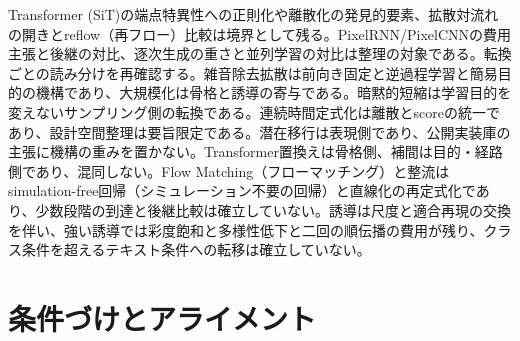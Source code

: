 \documentclass[lualatex,a4paper,10pt]{jlreq}
\begin{document}
Transformer (SiT)の端点特異性への正則化や離散化の発見的要素、拡散対流れの開きとreflow（再フロー）比較は境界として残る\autocite{btd026}。PixelRNN/PixelCNNの費用主張と後継の対比、逐次生成の重さと並列学習の対比は整理の対象である\autocite{btd017,btd018}。転換ごとの読み分けを再確認する。雑音除去拡散は前向き固定と逆過程学習と簡易目的の機構であり、大規模化は骨格と誘導の寄与である\autocite{btd019,btd030}。暗黙的短縮は学習目的を変えないサンプリング側の転換である\autocite{btd020}。連続時間定式化は離散とscoreの統一であり、設計空間整理は要旨限定である\autocite{btd021,btd022}。潜在移行は表現側であり、公開実装庫の主張に機構の重みを置かない\autocite{btd023}。Transformer置換えは骨格側、補間は目的・経路側であり、混同しない\autocite{btd025,btd026}。Flow Matching（フローマッチング）と整流はsimulation-free回帰（シミュレーション不要の回帰）と直線化の再定式化であり、少数段階の到達と後継比較は確立していない\autocite{btd027,btd028}。誘導は尺度と適合再現の交換を伴い、強い誘導では彩度飽和と多様性低下と二回の順伝播の費用が残り、クラス条件を超えるテキスト条件への転移は確立していない\autocite{btd030,btd032}。

\section{条件づけとアライメント}
\label{sec:conditioning}
\end{document}
